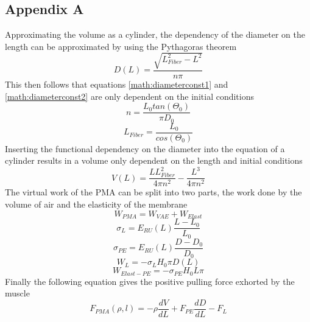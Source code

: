 \documentclass[11pt,a4paper]{article}
\begin{document}
\subsection{Appendix A}
\label{sub:staticforcederive}
Approximating the volume as a cylinder, the dependency of the diameter on the length can be approximated by using the Pythagoras theorem 
\begin{equation}
    D(L) = \frac{\sqrt{L_{Fiber}^2-L^2}}{n \pi}
\end{equation}
This then follows that equations \ref{math:diameterconst1} and \ref{math:diameterconst2} are only dependent on the initial conditions
\begin{equation}
    n = \frac{L_0tan(\Theta_0)}{\pi D_0}
    \label{math:diameterconst1}
\end{equation}
\begin{equation}
    L_{Fiber} = \frac{L_0}{cos(\Theta_0)}
    \label{math:diameterconst2}
\end{equation}
Inserting the functional dependency on the diameter into the equation of a cylinder results in a volume only dependent on the length and initial conditions
\begin{equation}
    V(L) = \frac{L L_{Fiber}^2}{4 \pi n^2}-\frac{L^3}{4 \pi n^2}
\end{equation}
The virtual work of the PMA can be split into two parts, the work done by the volume of air and the elasticity of the membrane 
\begin{equation}
    W_{PMA} = W_{VAE} + W_{Elast}
\end{equation}
\begin{equation}
    \sigma_{L} = E_{RU}(L) \frac{L-L_0}{L_0}
\end{equation}
\begin{equation}
    \sigma_{PE} = E_{RU}(L) \frac{D-D_0}{D_0}
\end{equation}
\begin{equation}
    W_{L} = -\sigma_{L} H_0 \pi D(L)
\end{equation}
\begin{equation}
    W_{Elast-PE} = -\sigma_{PE} H_0 L \pi
\end{equation}
Finally the following equation gives the positive pulling force exhorted by the muscle
\begin{equation}
    F_{PMA}(\rho, l) = -\rho \frac{dV}{dL}+F_{PE} \frac{dD}{dL}-F_L
    \label{math:staticforcederive}
\end{equation}
\end{document}
